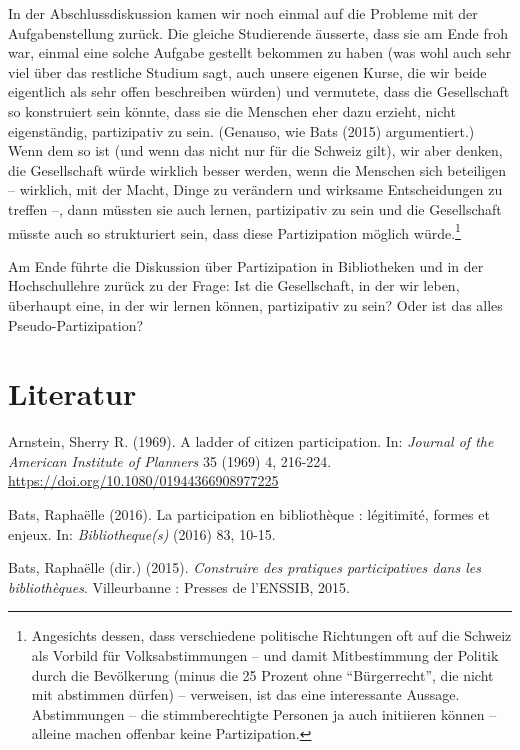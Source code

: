 \documentclass[a4paper,
fontsize=11pt,
oneside,
numbers=noperiodatend,
parskip=half-,
bibliography=totoc,
final
]{scrartcl}
\begin{document}
In der Abschlussdiskussion kamen wir noch einmal auf die Probleme mit
der Aufgabenstellung zurück. Die gleiche Studierende äusserte, dass sie
am Ende froh war, einmal eine solche Aufgabe gestellt bekommen zu haben
(was wohl auch sehr viel über das restliche Studium sagt, auch unsere
eigenen Kurse, die wir beide eigentlich als sehr offen beschreiben
würden) und vermutete, dass die Gesellschaft so konstruiert sein könnte,
dass sie die Menschen eher dazu erzieht, nicht eigenständig,
partizipativ zu sein. (Genauso, wie Bats (2015) argumentiert.) Wenn dem
so ist (und wenn das nicht nur für die Schweiz gilt), wir aber denken,
die Gesellschaft würde wirklich besser werden, wenn die Menschen sich
beteiligen -- wirklich, mit der Macht, Dinge zu verändern und wirksame
Entscheidungen zu treffen --, dann müssten sie auch lernen, partizipativ
zu sein und die Gesellschaft müsste auch so strukturiert sein, dass
diese Partizipation möglich würde.\footnote{Angesichts dessen, dass
  verschiedene politische Richtungen oft auf die Schweiz als Vorbild für
  Volksabstimmungen -- und damit Mitbestimmung der Politik durch die
  Bevölkerung (minus die 25 Prozent ohne \enquote{Bürgerrecht}, die
  nicht mit abstimmen dürfen) -- verweisen, ist das eine interessante
  Aussage. Abstimmungen -- die stimmberechtigte Personen ja auch
  initiieren können -- alleine machen offenbar keine Partizipation.}

Am Ende führte die Diskussion über Partizipation in Bibliotheken und in
der Hochschullehre zurück zu der Frage: Ist die Gesellschaft, in der wir
leben, überhaupt eine, in der wir lernen können, partizipativ zu sein?
Oder ist das alles Pseudo-Partizipation?

\hypertarget{literatur}{%
\section{Literatur}\label{literatur}}

Arnstein, Sherry R. (1969). A ladder of citizen participation. In:
\emph{Journal of the American Institute of Planners} 35 (1969) 4,
216-224.
\href{http://dx.doi.org/10.1080/01944366908977225}{https://doi.org/10.1080/01944366908977225}

Bats, Raphaëlle (2016). La participation en bibliothèque : légitimité,
formes et enjeux. In: \emph{Bibliotheque(s)} (2016) 83, 10-15.

Bats, Raphaëlle (dir.) (2015). \emph{Construire des pratiques
participatives dans les bibliothèques}. Villeurbanne : Presses de
l'ENSSIB, 2015.
\end{document}
